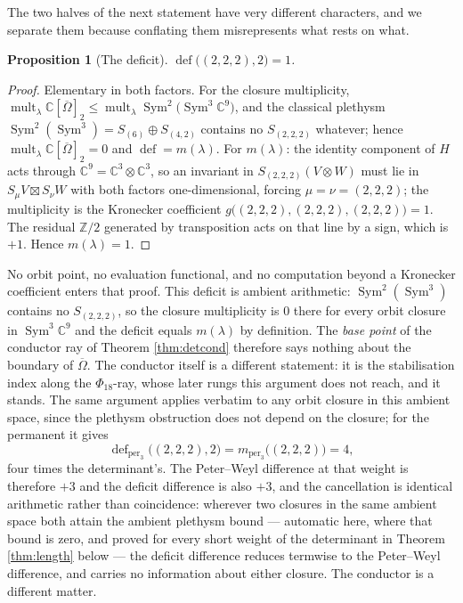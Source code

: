 \documentclass[11pt,reqno]{amsart}
\theoremstyle{plain}
\newtheorem{proposition}[theorem]{Proposition}
\theoremstyle{definition}
\DeclareMathOperator{\Sym}{Sym}
\DeclareMathOperator{\mult}{mult}
\DeclareMathOperator{\dfc}{def}
\DeclareMathOperator{\per}{per}
\newcommand{\cO}{\overline{\Omega}}
\newcommand{\bC}{\mathbb{C}}
\newcommand{\bZ}{\mathbb{Z}}
\begin{document}
The two halves of the next statement have very different characters, and we
separate them because conflating them misrepresents what rests on what.

\begin{proposition}[The deficit]\label{prop:def222}
$\dfc\big((2,2,2),2\big)=1$.
\end{proposition}

\begin{proof}
Elementary in both factors.  For the closure multiplicity,
$\mult_\lambda\bC[\cO]_2\le\mult_\lambda\Sym^{2}\big(\Sym^{3}\bC^{9}\big)$, and
the classical plethysm $\Sym^{2}(\Sym^{3})=S_{(6)}\oplus S_{(4,2)}$ contains no
$S_{(2,2,2)}$ whatever; hence $\mult_\lambda\bC[\cO]_2=0$ and
$\dfc=m(\lambda)$.  For $m(\lambda)$: the identity component of $H$ acts through
$\bC^{9}=\bC^{3}\otimes\bC^{3}$, so an invariant in
$S_{(2,2,2)}(V\otimes W)$ must lie in $S_\mu V\boxtimes S_\nu W$ with both
factors one-dimensional, forcing $\mu=\nu=(2,2,2)$; the multiplicity is the
Kronecker coefficient $g\big((2,2,2),(2,2,2),(2,2,2)\big)=1$.  The residual
$\bZ/2$ generated by transposition acts on that line by a sign, which is $+1$.
Hence $m(\lambda)=1$.
\end{proof}

No orbit point, no evaluation functional, and no computation beyond a Kronecker
coefficient enters that proof.  This deficit is ambient arithmetic:
$\Sym^{2}(\Sym^{3})$ contains no $S_{(2,2,2)}$, so the closure multiplicity is
$0$ there for every orbit closure in $\Sym^{3}\bC^{9}$ and the deficit equals
$m(\lambda)$ by definition.  The \emph{base point} of the conductor ray of
Theorem \ref{thm:detcond} therefore says nothing about the boundary of $\cO$.
The conductor itself is a different statement: it is the stabilisation index
along the $\Phi_{18}$-ray, whose later rungs this argument does not reach, and
it stands.  The same argument applies verbatim to any orbit
closure in this ambient space, since the plethysm obstruction does not depend on
the closure; for the permanent it gives
\[
  \dfc_{\per_3}\big((2,2,2),2\big)=m_{\per_3}\big((2,2,2)\big)=4 ,
\]
four times the determinant's.  The Peter--Weyl difference at that weight is
therefore $+3$ and the deficit difference is also $+3$, and the cancellation is
identical arithmetic rather than coincidence: wherever two closures in the same
ambient space both attain the ambient plethysm bound --- automatic here, where
that bound is zero, and proved for every short weight of the determinant in
Theorem \ref{thm:length} below --- the deficit difference reduces termwise to
the Peter--Weyl difference, and carries no information about either closure.
The conductor is a different matter.
\end{document}
